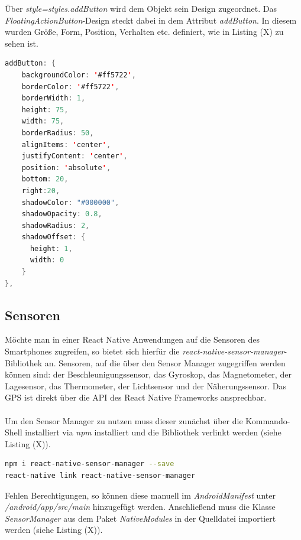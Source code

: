 Über \textit{style=styles.addButton} wird dem Objekt sein Design zugeordnet. Das \textit{FloatingActionButton}-Design steckt dabei in dem Attribut \textit{addButton}. In diesem wurden Größe, Form, Position, Verhalten etc. definiert, wie in Listing (X) zu sehen ist.

\begin{lstlisting}[caption=Das \textit{FloatingActionButton}-Design, label=lst:FABDesignReactNative, language=Java]
addButton: {
    backgroundColor: '#ff5722',
    borderColor: '#ff5722',
    borderWidth: 1,
    height: 75,
    width: 75,
    borderRadius: 50,
    alignItems: 'center',
    justifyContent: 'center',
    position: 'absolute',
    bottom: 20,
    right:20,
    shadowColor: "#000000",
    shadowOpacity: 0.8,
    shadowRadius: 2,
    shadowOffset: {
      height: 1,
      width: 0
    }
},
\end{lstlisting} 

\subsection{Sensoren}

Möchte man in einer React Native Anwendungen auf die Sensoren des Smartphones zugreifen, so bietet sich hierfür die \textit{react-native-sensor-manager}-Bibliothek an. Sensoren, auf die über den Sensor Manager zugegriffen werden können sind: der Beschleunigungssensor, das Gyroskop, das Magnetometer, der Lagesensor, das Thermometer, der Lichtsensor und der Näherungssensor. Das GPS ist direkt über die API des React Native Frameworks ansprechbar. 
\\
\\
Um den Sensor Manager zu nutzen muss dieser zunächst über die Kommando-Shell installiert via \textit{npm} installiert und die Bibliothek verlinkt werden (siehe Listing (X)).

\begin{lstlisting}[caption=Installation und Verlinkung der Bibliothek \textit{react-native-sensor-manager}, label=lst:InstallationSensorManagerRN, language=bash]
npm i react-native-sensor-manager --save
react-native link react-native-sensor-manager
\end{lstlisting}

Fehlen Berechtigungen, so können diese manuell im \textit{AndroidManifest} unter \textit{/android/app/src/main} hinzugefügt werden. Anschließend muss die Klasse \textit{SensorManager} aus dem Paket \textit{NativeModules} in der Quelldatei importiert werden (siehe Listing (X)). 

